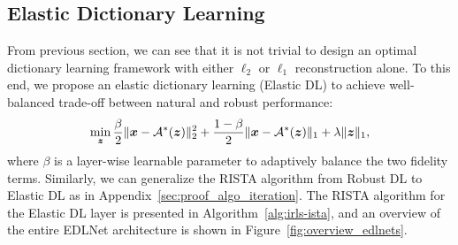    


















\subsection{Elastic Dictionary Learning}
\label{sec:edl}


From previous section, we can see that it is not trivial to design an optimal dictionary learning framework 
   with  either $\ell_2$ or $\ell_1$ reconstruction alone.
To this end, we propose an elastic dictionary learning (Elastic DL) to achieve
well-balanced trade-off between natural and robust performance:
\begin{equation}
\min_{\bm{z}} \frac{\beta}{2}\|{\bm{x}} - {\mathcal{A}}^*({\bm{z}})\|_2^2 + \frac{1-\beta}{2}\|{\bm{x}} - {\mathcal{A}}^*({\bm{z}})\|_1 + \lambda\|{\bm{z}}\|_1,
\label{eq:robust_dictionary_learning}
\end{equation}
where $\beta$ is a layer-wise learnable parameter to adaptively balance the two fidelity terms. 
Similarly, we can generalize the RISTA algorithm from Robust DL to Elastic DL as in Appendix~\ref{sec:proof_algo_iteration}. 
The RISTA algorithm for the Elastic DL layer is presented in Algorithm~\ref{alg:irls-ista}, and an overview of the entire EDLNet architecture is shown in Figure~\ref{fig:overview_edlnets}.


